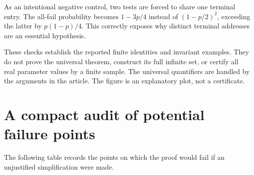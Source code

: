 As an intentional negative control, two tests are forced to share one
terminal entry. The all-fail probability becomes $1-3p/4$ instead of
$(1-p/2)^2$, exceeding the latter by $p(1-p)/4$. This correctly
exposes why distinct terminal addresses are an essential hypothesis.

These checks establish the reported finite identities and invariant
examples. They do not prove the universal theorem, construct its
full infinite set, or certify all real parameter values by a finite
sample. The universal quantifiers are handled by the arguments in
the article. The figure is an explanatory plot, not a certificate.

\clearpage
\section{A compact audit of potential failure points}
\label{sec:audit}

The following table records the points on which the proof would fail
if an unjustified simplification were made.

